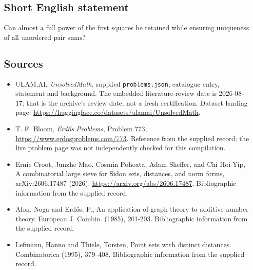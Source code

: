 \documentclass[11pt,a4paper]{article}
\begin{document}
\subsection{Short English statement}

Can almost a full power of the first squares be retained while ensuring uniqueness of all unordered pair sums?

\subsection{Sources}

{\small

\begin{itemize}

\item[\hypertarget{source:statement:1}{S1}] ULAM.AI, \emph{UnsolvedMath}, supplied \texttt{problems.json}, catalogue entry, statement and background. The embedded literature-review date is 2026-08-17; that is the archive’s review date, not a fresh certification. Dataset landing page: \url{https://huggingface.co/datasets/ulamai/UnsolvedMath}.

\item[\hypertarget{source:statement:2}{S2}] T. F. Bloom, \emph{Erdős Problems}, Problem 773, \url{https://www.erdosproblems.com/773}. Reference from the supplied record; the live problem page was not independently checked for this compilation.

\item[\hypertarget{source:statement:3}{S3}] Ernie Croot, Junzhe Mao, Cosmin Pohoata, Adam Sheffer, and Chi Hoi Yip, A combinatorial large sieve for Sidon sets, distances, and norm forms, arXiv:2606.17487 (2026). \url{https://arxiv.org/abs/2606.17487}. Bibliographic information from the supplied record.

\item[\hypertarget{source:statement:4}{S4}] Alon, Noga and Erd\H{o}s, P., An application of graph theory to additive number theory. European J. Combin. (1985), 201-203. Bibliographic information from the supplied record.

\item[\hypertarget{source:statement:5}{S5}] Lefmann, Hanno and Thiele, Torsten, Point sets with distinct distances. Combinatorica (1995), 379--408. Bibliographic information from the supplied record.

\end{itemize}

}

\label{end:statement}
\end{document}
